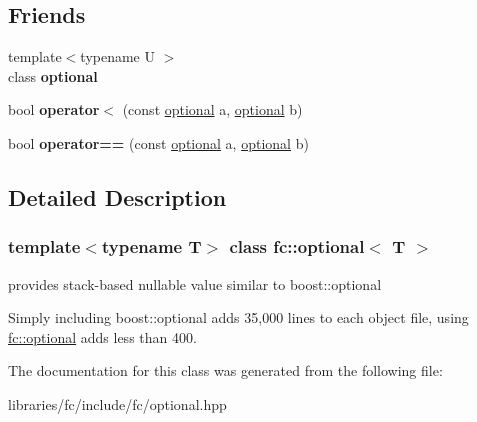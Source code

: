 \subsection*{Friends}
\begin{DoxyCompactItemize}
\item 
\mbox{\label{classfc_1_1optional_aa756d67787488b1e2bba885ce4da6fe0}} 
{\footnotesize template$<$typename U $>$ }\\class {\bfseries optional}
\item 
\mbox{\label{classfc_1_1optional_aed3aa0cd5eb4f7ef600b2e9ad295320f}} 
bool {\bfseries operator$<$} (const \mbox{\hyperlink{classfc_1_1optional}{optional}} a, \mbox{\hyperlink{classfc_1_1optional}{optional}} b)
\item 
\mbox{\label{classfc_1_1optional_a608be2170eb1ffcef97954156c7ebbd8}} 
bool {\bfseries operator==} (const \mbox{\hyperlink{classfc_1_1optional}{optional}} a, \mbox{\hyperlink{classfc_1_1optional}{optional}} b)
\end{DoxyCompactItemize}


\subsection{Detailed Description}
\subsubsection*{template$<$typename T$>$\newline
class fc\+::optional$<$ T $>$}

provides stack-\/based nullable value similar to boost\+::optional 

Simply including boost\+::optional adds 35,000 lines to each object file, using \mbox{\hyperlink{classfc_1_1optional}{fc\+::optional}} adds less than 400. 

The documentation for this class was generated from the following file\+:\begin{DoxyCompactItemize}
\item 
libraries/fc/include/fc/optional.\+hpp\end{DoxyCompactItemize}
